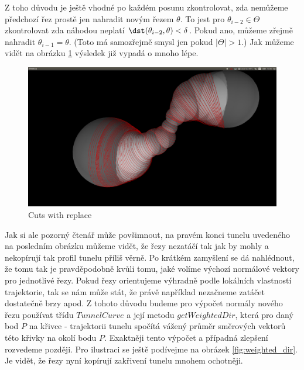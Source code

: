 Z toho důvodu je ještě vhodné po každém posunu zkontrolovat, zda nemůžeme předchozí
řez prostě jen nahradit novým řezem $ \theta $. To jest pro
$ \theta_{i - 2} \in \Theta $ zkontrolovat zda náhodou neplatí
$ \dst(\theta_{i - 2}, \theta) < \delta $. Pokud ano, můžeme zřejmě nahradit
$ \theta_{i - 1} = \theta $. (Toto má samozřejmě smysl jen pokud
$ |\Theta| > 1 $.) Jak můžeme vidět na obrázku \ref{fig:cuts_with_replace}
výsledek již vypadá o mnoho lépe.

\begin{figure}[ht]
    \centering
    \includegraphics[width=\textwidth]{img/cuts_with_replace.png}
    \caption{Cuts with replace}
  \centering
  \label{fig:cuts_with_replace}
\end{figure}

Jak si ale pozorný čtenář může povšimnout, na pravém konci tunelu uvedeného na
posledním obrázku můžeme vidět, že řezy nezatáčí tak jak by mohly a nekopírují tak
profil tunelu příliš věrně. Po krátkém zamyšlení se dá nahlédnout, že tomu tak
je pravděpodobně kvůli tomu, jaké volíme výchozí normálové vektory pro jednotlivé
řezy. Pokud řezy orientujeme výhradně podle lokálních vlastností trajektorie,
tak se nám může stát, že právě například nezačneme zatáčet dostatečně brzy apod.
Z tohoto důvodu budeme pro výpočet normály nového řezu používat třídu
$ TunnelCurve $ a její metodu $ getWeightedDir $, která pro daný bod $ P $ na křivce
- trajektorii tunelu spočítá vážený průměr směrových vektorů této křivky na
okolí bodu $ P $. Exaktněji tento výpočet a případná zlepšení rozvedeme později.
Pro ilustraci se ještě podívejme na obrázek \ref{fig:weighted_dir}. Je vidět, že
řezy nyní kopírují zakřivení tunelu mnohem ochotněji.


